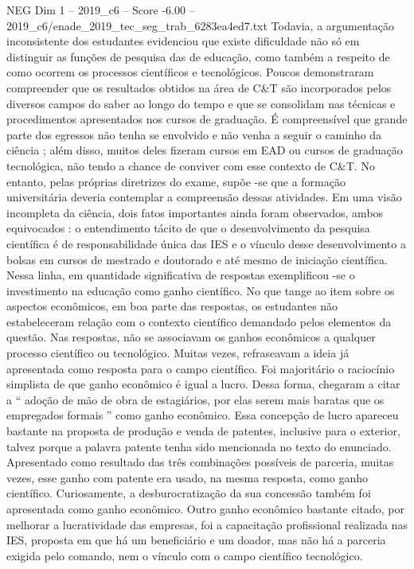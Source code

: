 \begin{textsample}{NEG Dim 1 – 2019\_c6 – Score -6.00 – 2019\_c6/enade\_2019\_tec\_seg\_trab\_6283ea4ed7.txt}
Todavia, a argumentação inconsistente dos estudantes evidenciou que existe dificuldade não só em distinguir as funções de pesquisa das de educação, como também a respeito de como ocorrem os processos científicos e tecnológicos.
Poucos demonstraram compreender que os resultados obtidos na área de C\&T são incorporados pelos diversos campos do saber ao longo do tempo e que se consolidam nas técnicas e procedimentos apresentados nos cursos de graduação.
É compreensível que grande parte dos egressos não tenha se envolvido e não venha a seguir o caminho da ciência ; além disso, muitos deles fizeram cursos em EAD ou cursos de graduação tecnológica, não tendo a chance de conviver com esse contexto de C\&T.
No entanto, pelas próprias diretrizes do exame, supõe -se que a formação universitária deveria contemplar a compreensão dessas atividades.
Em uma visão incompleta da ciência, dois fatos importantes ainda foram observados, ambos equivocados : o entendimento tácito de que o desenvolvimento da pesquisa científica é de responsabilidade única das IES e o vínculo desse desenvolvimento a bolsas em cursos de mestrado e doutorado e até mesmo de iniciação científica.
Nessa linha, em quantidade significativa de respostas exemplificou -se o investimento na educação como ganho científico.
No que tange ao item sobre os aspectos econômicos, em boa parte das respostas, os estudantes não estabeleceram relação com o contexto científico demandado pelos elementos da questão.
Nas respostas, não se associavam os ganhos econômicos a qualquer processo científico ou tecnológico.
Muitas vezes, refraseavam a ideia já apresentada como resposta para o campo científico.
Foi majoritário o raciocínio simplista de que ganho econômico é igual a lucro.
Dessa forma, chegaram a citar a “ adoção de mão de obra de estagiários, por elas serem mais baratas que os empregados formais ” como ganho econômico.
Essa concepção de lucro apareceu bastante na proposta de produção e venda de patentes, inclusive para o exterior, talvez porque a palavra patente tenha sido mencionada no texto do enunciado.
Apresentado como resultado das três combinações possíveis de parceria, muitas vezes, esse ganho com patente era usado, na mesma resposta, como ganho científico.
Curiosamente, a desburocratização da sua concessão também foi apresentada como ganho econômico.
Outro ganho econômico bastante citado, por melhorar a lucratividade das empresas, foi a capacitação profissional realizada nas IES, proposta em que há um beneficiário e um doador, mas não há a parceria exigida pelo comando, nem o vínculo com o campo científico tecnológico.

\end{textsample}
